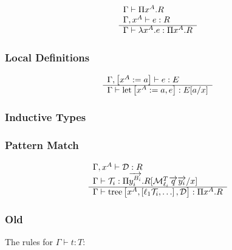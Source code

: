 $$
\begin{array}{l} 
    \Gamma \vdash \Pi x^A.R
    \\
    \Gamma, x^A \vdash e: R
 \\ \hline 
    \Gamma \vdash \lambda x^A. e : \Pi x^A. R
 \end{array}
$$







\subsubsection{Local Definitions}

$$
\begin{array}{l} 
    \Gamma, \left[ {x^A := a} \right] \vdash e : E
 \\ \hline 
    \Gamma \vdash {\text{let}} \left[ {x^A := a, e} \right] : E[a/x]
 \end{array}
$$





\subsubsection{Inductive Types}






\subsubsection{Pattern Match}

$$
\begin{array}{l} 
    \Gamma, x^A \vdash {\mathcal D}: R
    \\
    \Gamma \vdash
    {\mathcal T}_i:
    \Pi {\overrightarrow {y_i^{B_i}}}. R[{\cal M}_{\ell_i}^T {\overrightarrow {q}} {\overrightarrow {y_i}} / x]
 \\ \hline 
    \Gamma \vdash
    {\text{tree}}\left[ {x^A, \left[ {\ell_1 {\mathcal T}_i, \ldots} \right], {\mathcal D}} \right]
    : \Pi x^A. R
 \end{array}
$$



\subsubsection{Old}

The rules for $\Gamma \vdash t : T$:

